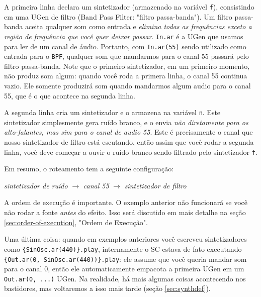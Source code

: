 A primeira linha declara um sintetizador (armazenado na variável \texttt{f}), consistindo em uma UGen de filtro (Band Pass Filter: "filtro passa-banda"). Um filtro passa-banda aceita qualquer som como entrada e \emph{elimina todas as frequências exceto a região de frequência que você quer deixar passar}. \texttt{In.ar} é a UGen que usamos para ler de um canal de áudio. Portanto, com \texttt{In.ar(55)} sendo utilizado como entrada para o \texttt{BPF}, qualquer som que mandarmos para o canal 55 passará pelo filtro passa-banda. Note que o primeiro sintetizador, em um primeiro momento, não produz som algum: quando você roda a primera linha, o canal 55 continua vazio. Ele somente produzirá som quando mandarmos algum audio para o canal 55, que é o que acontece na segunda linha.

A segunda linha cria um sintetizador e o armazena na variável \texttt{n}. Este sintetizador simplesmente gera ruído branco, e o envia \emph{não diretamente para os alto-falantes, mas sim para o canal de audio 55}. Este é precisamente o canal que nosso sintetizador de filtro está escutando, então assim que você rodar a segunda linha, você deve começar a ouvir o ruído branco sendo filtrado pelo sintetizador \texttt{f}.

Em resumo, o roteamento tem a seguinte configuração: 

\begin{center}
\emph{sintetizador de ruído} $\rightarrow$ \emph{canal 55} $\rightarrow$ \emph{sintetizador de filtro}
\end{center}

A ordem de execução é importante. O exemplo anterior não funcionará se você não rodar a fonte \emph{antes} do efeito. Isso será discutido em mais detalhe na seção \ref{sec:order-of-execution}, "Ordem de Execução".

Uma última coisa: quando em exemplos anteriores você escreveu sintetizadores como \texttt{\{SinOsc.ar(440)\}.play}, internamente o SC estava de fato executando \texttt{\{Out.ar(0, SinOsc.ar(440))\}.play}: ele assume que você queria mandar som para o canal 0, então ele automaticamente empacota a primeira UGen em um \texttt{Out.ar(0, ...)} UGen. Na realidade, há mais algumas coisas acontecendo nos bastidores, mas voltaremos a isso mais tarde (seção \ref{sec:synthdef}).
